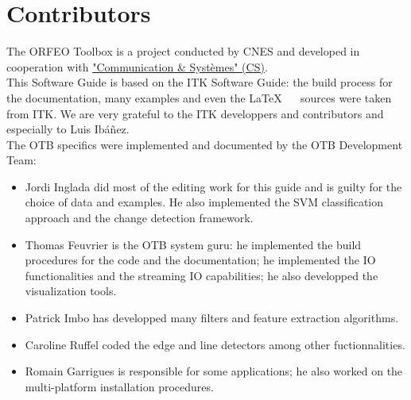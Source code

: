 \chapter*{Contributors}
\noindent

The ORFEO Toolbox is a project conducted by CNES and developed in
cooperation with \href{http://www.c-s.fr}{"Communication \&
  Syst\`{e}mes" (CS)}.\\

This Software Guide is based on the ITK Software Guide: the build
process for the documentation, many examples and even the \LaTeX~ ~
sources were taken from ITK. We are very grateful to the ITK
developpers and contributors and especially to Luis Ib\'a\~nez.\\

The OTB specifics were implemented and documented by the OTB Development Team:
\begin{itemize}
  \item Jordi Inglada did most of the editing work for this guide and
  is guilty for the choice of data and examples. He also implemented
  the SVM classification approach and the change detection framework.
  \item Thomas Feuvrier is the OTB system guru: he implemented the
  build procedures for the code and the documentation; he implemented
  the IO functionalities and the streaming IO capabilities; he also
  developped the visualization tools.
  \item Patrick Imbo has developped many filters and feature
  extraction algorithms.
  \item Caroline Ruffel coded the edge and line detectors among other
  fuctionnalities.
  \item Romain Garrigues is responsible for some applications; he also
  worked on the multi-platform installation procedures.
\end{itemize}

